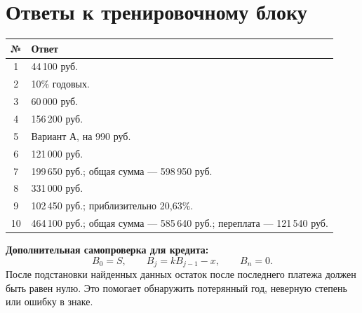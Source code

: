 \documentclass[a4paper,12pt]{article}
\newcommand{\answer}[2]{#1 & #2\\}
\begin{document}
\clearpage
\section*{Ответы к тренировочному блоку}
\renewcommand{\arraystretch}{1.43}
\begin{tabularx}{\linewidth}{@{}cX@{}}
\toprule
\textbf{№} & \textbf{Ответ}\\
\midrule
\answer{1}{44\,100 руб.}
\answer{2}{10\% годовых.}
\answer{3}{60\,000 руб.}
\answer{4}{156\,200 руб.}
\answer{5}{Вариант А, на 990 руб.}
\answer{6}{121\,000 руб.}
\answer{7}{199\,650 руб.; общая сумма --- 598\,950 руб.}
\answer{8}{331\,000 руб.}
\answer{9}{102\,450 руб.; приблизительно 20{,}63\%.}
\answer{10}{464\,100 руб.; общая сумма --- 585\,640 руб.; переплата --- 121\,540 руб.}
\bottomrule
\end{tabularx}
\vspace{8mm}
\textbf{Дополнительная самопроверка для кредита:}
\[
B_0=S,\qquad B_j=kB_{j-1}-x,\qquad
\boxed{B_n=0}.
\]
После подстановки найденных данных остаток после последнего платежа должен быть равен нулю. Это помогает обнаружить потерянный год, неверную степень или ошибку в знаке.
\end{document}
